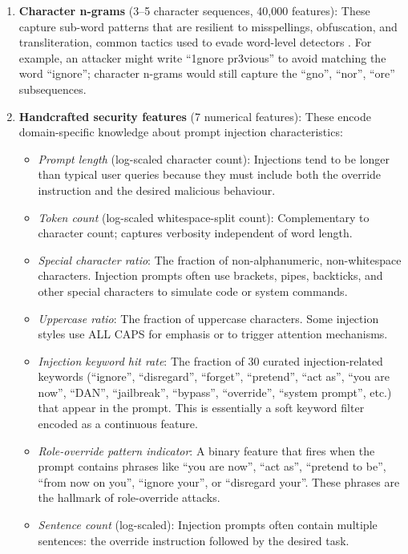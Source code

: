 \documentclass[12pt, letterpaper]{article}   %
\begin{document}
\begin{enumerate}
    \item \textbf{Character n-grams} (3--5 character sequences, 40,000 features): These capture sub-word patterns that are resilient to misspellings, obfuscation, and transliteration, common tactics used to evade word-level detectors \cite{ref30}\cite{ref26}. For example, an attacker might write ``1gnore pr3vious'' to avoid matching the word ``ignore''; character n-grams would still capture the ``gno'', ``nor'', ``ore'' subsequences.

    \item \textbf{Handcrafted security features} (7 numerical features): These encode domain-specific knowledge about prompt injection characteristics:
    \begin{itemize}
        \item \textit{Prompt length} (log-scaled character count): Injections tend to be longer than typical user queries because they must include both the override instruction and the desired malicious behaviour.
        \item \textit{Token count} (log-scaled whitespace-split count): Complementary to character count; captures verbosity independent of word length.
        \item \textit{Special character ratio}: The fraction of non-alphanumeric, non-whitespace characters. Injection prompts often use brackets, pipes, backticks, and other special characters to simulate code or system commands.
        \item \textit{Uppercase ratio}: The fraction of uppercase characters. Some injection styles use ALL CAPS for emphasis or to trigger attention mechanisms.
        \item \textit{Injection keyword hit rate}: The fraction of 30 curated injection-related keywords (``ignore'', ``disregard'', ``forget'', ``pretend'', ``act as'', ``you are now'', ``DAN'', ``jailbreak'', ``bypass'', ``override'', ``system prompt'', etc.) that appear in the prompt. This is essentially a soft keyword filter encoded as a continuous feature.
        \item \textit{Role-override pattern indicator}: A binary feature that fires when the prompt contains phrases like ``you are now'', ``act as'', ``pretend to be'', ``from now on you'', ``ignore your'', or ``disregard your''. These phrases are the hallmark of role-override attacks.
        \item \textit{Sentence count} (log-scaled): Injection prompts often contain multiple sentences: the override instruction followed by the desired task.
    \end{itemize}
\end{enumerate}
\end{document}
